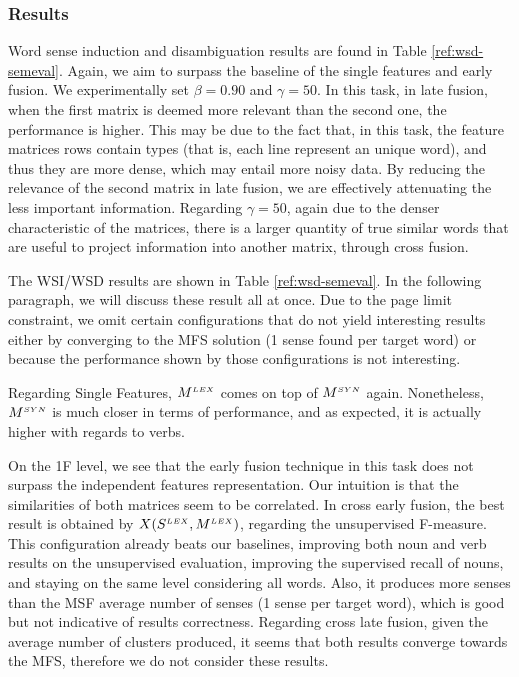 \subsubsection{Results}
Word sense induction and disambiguation results are found in Table \ref{ref:wsd-semeval}. Again, we aim to surpass the baseline of the single features and early fusion.  We experimentally set $\beta=0.90$ and $\gamma=50$. In this task, in late fusion, when the first matrix  is deemed more relevant than the second one, the performance is higher. This may be due to the fact that, in this task, the feature matrices rows contain types (that is, each line represent an unique word), and thus they are more dense, which may entail more noisy data. By reducing the relevance of the second matrix in late fusion, we are effectively attenuating the less important information. Regarding $\gamma=50$, again due to the denser characteristic of the matrices, there is a larger quantity of true similar words that are useful to project information into another matrix, through cross fusion.  

The WSI/WSD results are shown in Table \ref{ref:wsd-semeval}. In the following paragraph, we will discuss these result all at once. Due to the page limit constraint, we omit certain configurations that do not yield interesting results either by converging to the MFS solution (1 sense found per target word) or because the performance shown by those  configurations is not interesting.

Regarding Single Features, $M^{\scriptscriptstyle LEX}$ comes on top of $M^{\scriptscriptstyle SYN}$ again. Nonetheless, $M^{\scriptscriptstyle SYN}$ is much closer in terms of performance, and as expected, it is actually higher with regards to verbs. 

On the 1F level, we see that the early fusion technique in this task does not surpass the independent features representation. Our intuition is that the similarities of both matrices seem to be correlated. In cross early fusion, the best result is obtained by $X(S^{\scriptscriptstyle LEX}, M^{\scriptscriptstyle LEX})$,  regarding the unsupervised F-measure. This configuration already beats our baselines, improving both noun and verb results on the unsupervised evaluation, improving the supervised recall of nouns, and staying on the same level considering all words. Also, it produces more senses than the MSF average number of senses (1 sense per target word), which is good but not indicative of results correctness. Regarding cross late fusion, given the average number of clusters produced, it seems that both results converge towards the MFS, therefore we do not consider these results.

